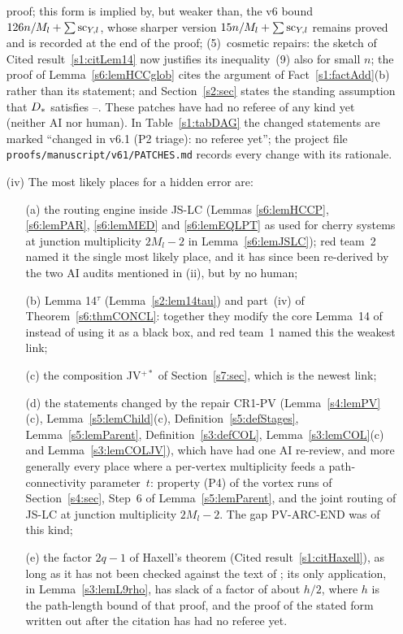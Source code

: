 \begin{remark}
\begin{enumerate}
proof; this form is implied by, but weaker than, the v6 bound
$126n/M_l+\sum\sco_{Y,l}$, whose sharper version $15n/M_l+\sum\sco_{Y,l}$ remains
proved and is recorded at the end of the proof;
(5)~cosmetic repairs: the sketch of Cited result~\ref{s1:citLem14} now justifies
its inequality~(9) also for small $n$; the proof of Lemma~\ref{s6:lemHCCglob}
cites the argument of Fact~\ref{s1:factAdd}(b) rather than its statement; and
Section~\ref{s2:sec} states the standing assumption that $\Dstar$ satisfies
--.
These patches have had no referee of any kind yet (neither AI nor human). In
Table~\ref{s1:tabDAG} the changed statements are marked ``changed in v6.1 (P2
triage): no referee yet''; the project file
\texttt{proofs/\allowbreak{}manuscript/\allowbreak{}v61/\allowbreak{}PATCHES.md}
records every change with its rationale.

\item[(iv)] The most likely places for a hidden error are:
\begin{enumerate}
\item[(a)] the routing engine inside JS-LC (Lemmas \ref{s6:lemHCCP},
\ref{s6:lemPAR}, \ref{s6:lemMED} and \ref{s6:lemEQLPT} as used for cherry
systems at junction multiplicity $2M_l-2$ in Lemma~\ref{s6:lemJSLC}); red
team~2 named it the single most likely place, and it has since been re-derived by
the two AI audits mentioned in (ii), but by no human;
\item[(b)] Lemma 14$^\tau$ (Lemma~\ref{s2:lem14tau}) and part~(iv) of
Theorem~\ref{s6:thmCONCL}: together they modify the core Lemma~14 of
\cite{BM} instead of using it as a black box, and red team~1 named this the
weakest link;
\item[(c)] the composition JV$^{+*}$ of Section~\ref{s7:sec}, which is the
newest link;
\item[(d)] the statements changed by the repair \textsf{CR1-PV}
(Lemma~\ref{s4:lemPV}(c), Lemma~\ref{s5:lemChild}(c),
Definition~\ref{s5:defStages}, Lemma~\ref{s5:lemParent},
Definition~\ref{s3:defCOL}, Lemma~\ref{s3:lemCOL}(c) and
Lemma~\ref{s3:lemCOLJV}), which have had one AI re-review, and more generally
every place where a per-vertex multiplicity feeds a path-connectivity
parameter~$t$: property (P4) of the vortex runs of Section~\ref{s4:sec}, Step~6
of Lemma~\ref{s5:lemParent}, and the joint routing of JS-LC at junction
multiplicity $2M_l-2$. The gap PV-ARC-END was of this kind;
\item[(e)] the factor $2q-1$ of Haxell's theorem (Cited
result~\ref{s1:citHaxell}), as long as it has not been checked against the
text of \cite{Hax95}; its only application, in
Lemma~\ref{s3:lemL9rho}, has slack of a factor of about $h/2$, where $h$ is the path-length bound of
that proof, and the proof of
the stated form written out after the citation has had no referee yet.
\end{enumerate}


\end{enumerate}
\end{remark}
